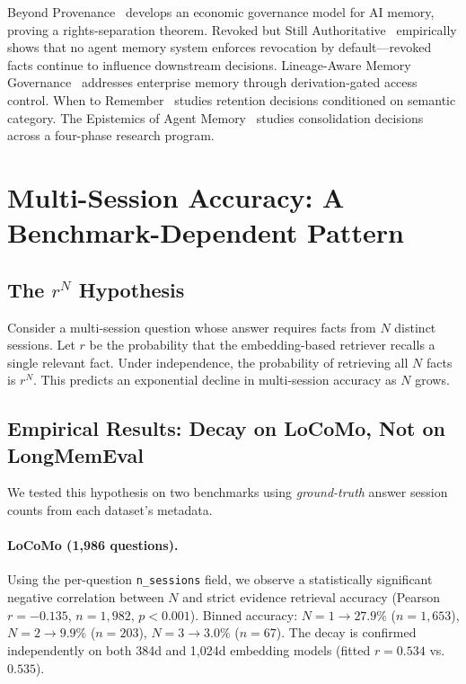 \documentclass{article}
\begin{document}
Beyond Provenance~\cite{beyondprovenance} develops an economic governance model for AI memory, proving a rights-separation theorem. Revoked but Still Authoritative~\cite{revoked} empirically shows that no agent memory system enforces revocation by default---revoked facts continue to influence downstream decisions. Lineage-Aware Memory Governance~\cite{lineage} addresses enterprise memory through derivation-gated access control. When to Remember~\cite{whentoremember} studies retention decisions conditioned on semantic category. The Epistemics of Agent Memory~\cite{epistemics} studies consolidation decisions across a four-phase research program.

\section{Multi-Session Accuracy: A Benchmark-Dependent Pattern}
\label{sec:rn}

\subsection{The $r^N$ Hypothesis}

Consider a multi-session question whose answer requires facts from $N$ distinct sessions. Let $r$ be the probability that the embedding-based retriever recalls a single relevant fact. Under independence, the probability of retrieving all $N$ facts is $r^N$. This predicts an exponential decline in multi-session accuracy as $N$ grows.

\subsection{Empirical Results: Decay on LoCoMo, Not on LongMemEval}

We tested this hypothesis on two benchmarks using \emph{ground-truth} answer session counts from each dataset's metadata.

\paragraph{LoCoMo (1{,}986 questions).}
Using the per-question \texttt{n\_sessions} field, we observe a statistically significant negative correlation between $N$ and strict evidence retrieval accuracy (Pearson $r = -0.135$, $n = 1{,}982$, $p < 0.001$). Binned accuracy: $N{=}1 \to 27.9\%$ ($n{=}1{,}653$), $N{=}2 \to 9.9\%$ ($n{=}203$), $N{=}3 \to 3.0\%$ ($n{=}67$). The decay is confirmed independently on both 384d and 1{,}024d embedding models (fitted $r = 0.534$ vs.\ $0.535$).
\end{document}
